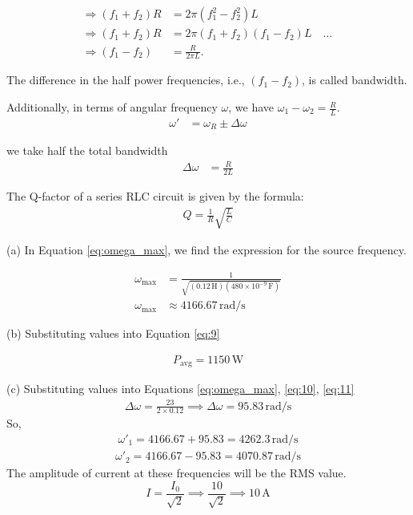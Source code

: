 \documentclass[journal,12pt,twocolumn]{IEEEtran}
\theoremstyle{remark}
\begin{document}
\begin{align}
    \Rightarrow (f_1 + f_2) R &= 2\pi (f_1^2 - f_2^2) L \\
    \Rightarrow (f_1 + f_2) R &= 2\pi (f_1 + f_2)(f_1 - f_2) L \quad \ldots \, \\
    \Rightarrow (f_1 - f_2) &= \frac{R}{2\pi L}.
\end{align}

The difference in the half power frequencies, i.e., $(f_1 - f_2)$, is called bandwidth.

Additionally, in terms of angular frequency \(\omega\), we have \(\omega_1 - \omega_2 = \frac{R}{L}\).
\begin{align}
    \omega' &= \omega_R \pm \Delta\omega \label{eq:10}
\end{align}

we take half the total bandwidth
\begin{align}
    \Delta\omega &= \frac{R}{2L} 
    \label{eq:11}
\end{align}

The Q-factor of a series RLC circuit is given by the formula:
\begin{align}
    Q = \frac{1}{R} \sqrt{\frac{L}{C}} \label{eq:Qfact}
\end{align}

(a) In Equation \eqref{eq:omega_max}, we find the expression for the source frequency.

\begin{align}
    \omega_{\text{max}} &= \frac{1}{\sqrt{(0.12 \, \text{H})(480 \times 10^{-9} \, \text{F})}} \\
    \omega_{\text{max}} &\approx 4166.67 \, \text{rad/s}
\end{align}

(b)
Substituting values into Equation \eqref{eq:9}

\begin{align}
    P_{\text{avg}} = 1150 \, \text{W}
\end{align}

(c)
Substituting values into Equations \eqref{eq:omega_max}, \eqref{eq:10}, \eqref{eq:11}
\begin{align}
    \Delta\omega = \frac{23}{2 \times 0.12} \implies \Delta\omega = 95.83 \, \text{rad/s}
\end{align}
So,
\begin{align}
    \omega'_1 = 4166.67 + 95.83 = 4262.3 \, \text{rad/s} 
\end{align}
\begin{align}
    \omega'_2 = 4166.67 - 95.83 = 4070.87 \, \text{rad/s} 
\end{align}
The amplitude of current at these frequencies will be the RMS value.
\[
    I = \frac{I_0}{\sqrt{2}} \implies \frac{10}{\sqrt{2}} \implies 10 \, \text{A}
\]
\end{document}

